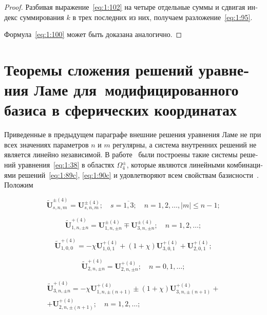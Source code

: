 \begin{russian}
\begin{proof}
Разбивая выражение~\eqref{eq:1:102} на четыре отдельные суммы и сдвигая индекс суммирования $k$ в трех последних из них, получаем разложение~\eqref{eq:1:95}.

Формула~\eqref{eq:1:100} может быть доказана аналогично.
\end{proof}

\section[Теоремы сложения решений уравнения Ламе для модифицированного базиса в сферических координатах]{Теоремы сложения решений уравнения Ламе для~модифицированного базиса в сферических координатах}

Приведенные в предыдущем параграфе внешние решения уравнения Ламе не при всех значениях параметров $n$ и $m$ регулярны, а система внутренних решений не является линейно независимой. В работе~\cite{Nikolaev1993} были построены такие системы решений уравнения~\eqref{eq:1:38} в областях $\Omega_4^{\pm}$, которые являются линейными комбинациями решений~\eqref{eq:1:89c}, \eqref{eq:1:90c} и удовлетворяют всем свойствам базисности~\cite{Nikolaev1998}. Положим

\begin{equation}\label{eq:1:89b}
\mathbf{\tilde U}_{s,n,m}^{\pm(4)}=\mathbf{U}_{s,n,m}^{\pm(4)};\quad s=\overline{1,3};\quad n=1,2,\dots, |m|\le n-1;
\end{equation}

\begin{equation}\label{eq:1:90b}
\mathbf{\tilde U}_{1,n,\pm n}^{+(4)}=\mathbf{U}_{1,n,\pm n}^{\pm(4)}\mp\mathbf{U}_{3,n,\pm n}^{\pm(4)};\quad n=1,2,\dots;
\end{equation}

\begin{equation}\label{eq:1:91b}
\mathbf{\tilde U}_{1,0,0}^{+(4)}=-\chi\mathbf{U}_{1,0,1}^{+(4)}+(1+\chi)\mathbf{U}_{3,0,1}^{+(4)}+\mathbf{U}_{2,0,1}^{+(4)};
\end{equation}

\begin{equation}\label{eq:1:92b}
\mathbf{\tilde U}_{2,n,\pm n}^{+(4)}=\mathbf{U}_{2,n,\pm n}^{+(4)};\quad n=0,1,\dots;
\end{equation}

\begin{multline}\label{eq:1:93b}
\mathbf{\tilde U}_{3,n,\pm n}^{+(4)}=-\chi\mathbf{U}_{1,n,\pm (n+1)}^{+(4)}\pm(1+\chi)\mathbf{U}_{3,n,\pm (n+1)}^{+(4)}+ \\
+\mathbf{U}_{2,n,\pm (n+1)}^{+(4)};\quad n=1,2,\dots;
\end{multline}


\end{russian}
